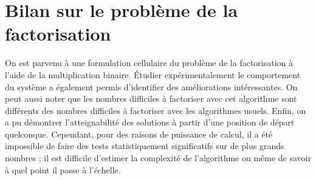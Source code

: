 

\section*{Bilan sur le problème de la factorisation}


On est parvenu à une formulation cellulaire du problème de la factorisation à l'aide de la multiplication binaire. Étudier expérimentalement le comportement du système a également permis d'identifier des améliorations intéressantes. On peut aussi noter que les nombres difficiles à factoriser avec cet algorithme sont différents des nombres difficiles à factoriser avec les algorithmes usuels. Enfin, on a pu démontrer l'atteignabilité des solutions à partir d'une position de départ quelconque. Cependant, pour des raisons de puissance de calcul, il a été impossible de faire des tests statistiquement significatifs sur de plus grands nombres : il est difficile d'estimer la complexité de l'algorithme ou même de savoir à quel point il passe à l'échelle.



